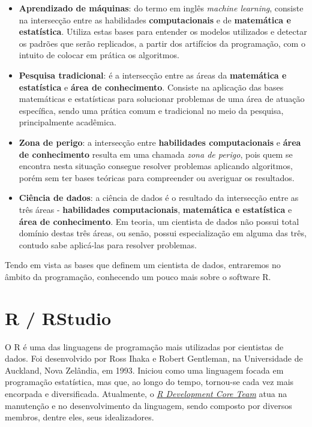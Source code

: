 \documentclass[
  brazilian,
]{book}
\begin{document}
\begin{itemize}
\item
  \textbf{Aprendizado de máquinas}: do termo em inglês \emph{machine learning}, consiste na intersecção entre as habilidades \textbf{computacionais} e de \textbf{matemática e estatística}. Utiliza estas bases para entender os modelos utilizados e detectar os padrões que serão replicados, a partir dos artifícios da programação, com o intuito de colocar em prática os algoritmos.
\item
  \textbf{Pesquisa tradicional}: é a intersecção entre as áreas da \textbf{matemática e estatística} e \textbf{área de conhecimento}. Consiste na aplicação das bases matemáticas e estatísticas para solucionar problemas de uma área de atuação específica, sendo uma prática comum e tradicional no meio da pesquisa, principalmente acadêmica.
\item
  \textbf{Zona de perigo}: a intersecção entre \textbf{habilidades computacionais} e \textbf{área de conhecimento} resulta em uma chamada \emph{zona de perigo}, pois quem se encontra nesta situação consegue resolver problemas aplicando algoritmos, porém sem ter bases teóricas para compreender ou averiguar os resultados.
\item
  \textbf{Ciência de dados}: a ciência de dados é o resultado da intersecção entre as três áreas - \textbf{habilidades computacionais}, \textbf{matemática e estatística} e \textbf{área de conhecimento}. Em teoria, um cientista de dados não possui total domínio destas três áreas, ou senão, possui especialização em alguma das três, contudo sabe aplicá-las para resolver problemas.
\end{itemize}

Tendo em vista as bases que definem um cientista de dados, entraremos no âmbito da programação, conhecendo um pouco mais sobre o software R.

\hypertarget{r-rstudio}{%
\section{R / RStudio}\label{r-rstudio}}

O R é uma das linguagens de programação mais utilizadas por cientistas de dados. Foi desenvolvido por Ross Ihaka e Robert Gentleman, na Universidade de Auckland, Nova Zelândia, em 1993. Iniciou como uma linguagem focada em programação estatística, mas que, ao longo do tempo, tornou-se cada vez mais encorpada e diversificada. Atualmente, o \href{https://www.r-project.org/foundation/}{\emph{R Development Core Team}} atua na manutenção e no desenvolvimento da linguagem, sendo composto por diversos membros, dentre eles, seus idealizadores.
\end{document}

